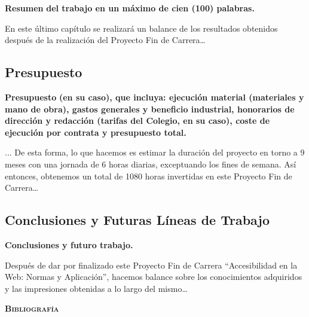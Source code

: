 \documentclass[a4paper]{article}
\begin{document}
\bigskip


\bigskip


\bigskip


\bigskip

{
{\textbf{R}}{\textbf{esumen }}{\textbf{del trabajo en un máximo de cien (100) palabras. }}}


\bigskip

{
En este último capítulo se realizará un balance de los resultados obtenidos después de la realización del Proyecto Fin de Carrera…}


\bigskip


\bigskip

\subsection{Presupuesto}
{
{\textbf{P}}{\textbf{resupuesto }}{\textbf{(en su caso), que incluya: ejecución material (materiales y mano de obra), gastos generales y beneficio industrial, honorarios de dirección y redacción (tarifas del Colegio, en su caso), coste de ejecución por contrata y presupuesto total.}}}


\bigskip

{
... De esta forma, lo que hacemos es estimar la duración del proyecto en torno a 9 meses con una jornada de 6 horas diarias, exceptuando los fines de semana. Así entonces, obtenemos un total de 1080 horas invertidas en este Proyecto Fin de Carrera…}


\bigskip

\subsection[Conclusiones y Futuras Líneas de Trabajo]{{Conclusiones}{ y Futuras Líneas de Trabajo}}
{\bfseries
Conclusiones y futuro trabajo.}


\bigskip

{
Después de dar por finalizado este Proyecto Fin de Carrera “Accesibilidad en la Web: Normas y Aplicación”, hacemos balance sobre los conocimientos adquiridos y las impresiones obtenidas a lo largo del mismo…}


\bigskip


\bigskip

\clearpage\setcounter{page}{1}\pagestyle{Convertirxii}
{\raggedleft\bfseries\scshape
Bibliografía
\par}

\clearpage
\bigskip

\clearpage\setcounter{page}{1}\pagestyle{Convertirxiii}
\end{document}
